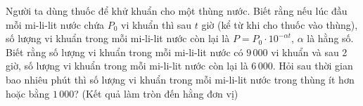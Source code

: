 \begin{ex}%
	Người ta dùng thuốc để khử khuẩn cho một thùng nước. Biết rằng nếu lúc đầu mỗi mi-li-lit nước chứa $P_{0}$ vi khuẩn thì sau $t$ giờ (kể từ khi cho thuốc vào thùng), số lượng vi khuẩn trong mỗi mi-li-lit nước còn lại là $P=P_{0} \cdot 10^{-\alpha t}, \,\alpha$ là hằng số. Biết rằng số lượng vi khuẩn trong mỗi mi-li-lit nước có $9\,000$ vi khuẩn và sau 2 giờ, số lượng vi khuẩn trong mỗi mi-li-lit nước còn lại là $6\,000$. Hỏi sau thời gian bao nhiêu phút thì số lượng vi khuẩn trong mỗi mi-li-lit nước trong thùng ít hơn hoặc bằng $1\,000$? (Kết quả làm tròn đến hằng đơn vị)
	
\end{ex}
